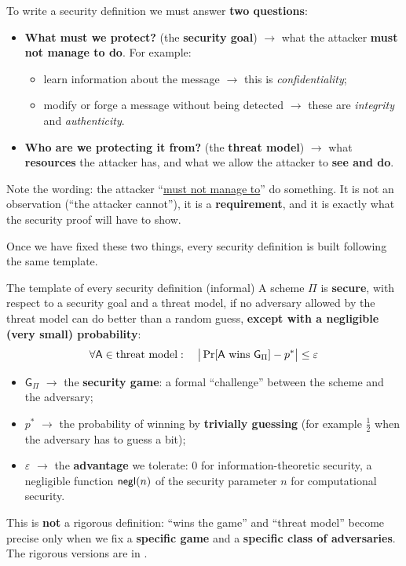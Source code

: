 To write a security definition we must answer \textbf{two questions}:
\begin{itemize}
  \item \textbf{What must we protect?} (the \textbf{security goal}) $\to$ what the attacker \textbf{must not manage to do}. For example:
  \begin{itemize}
    \item learn information about the message $\to$ this is \textit{confidentiality};
    \item modify or forge a message without being detected $\to$ these are \textit{integrity} and \textit{authenticity}.
  \end{itemize}
  \item \textbf{Who are we protecting it from?} (the \textbf{threat model}) $\to$ what \textbf{resources} the attacker has, and what we allow the attacker to \textbf{see and do}.
\end{itemize}

Note the wording: the attacker ``\underline{must not manage to}'' do something. It is not an observation (``the attacker cannot''), it is a \textbf{requirement}, and it is exactly what the security proof will have to show.

Once we have fixed these two things, every security definition is built following the same template.

\begin{framedobs}[label={obs:template}]{The template of every security definition (informal)}
  A scheme $\Pi$ is \textbf{secure}, with respect to a security goal and a threat model, if no adversary allowed by the threat model can do better than a random guess, \textbf{except with a negligible (very small) probability}:
  \[
    \forall \mathsf{A} \in \text{threat model}: \quad \big|\Pr[\mathsf{A} \text{ wins } \mathsf{G}_{\Pi}] - p^*\big| \leq \varepsilon
  \]
  \begin{itemize}
    \item $\mathsf{G}_{\Pi}$ $\to$ the \textbf{security game}: a formal ``challenge'' between the scheme and the adversary;
    \item $p^*$ $\to$ the probability of winning by \textbf{trivially guessing} (for example $\frac{1}{2}$ when the adversary has to guess a bit);
    \item $\varepsilon$ $\to$ the \textbf{advantage} we tolerate: $0$ for information-theoretic security, a negligible function $\mathsf{negl}(n)$ of the security parameter $n$ for computational security.
  \end{itemize}
  This is \textbf{not} a rigorous definition: ``wins the game'' and ``threat model'' become precise only when we fix a \textbf{specific game} and a \textbf{specific class of adversaries}. The rigorous versions are in .
\end{framedobs}

